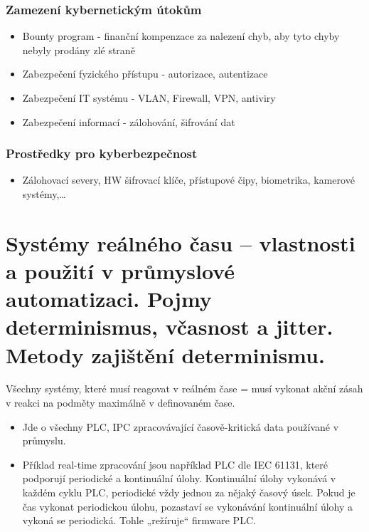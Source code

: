 \subsubsection*{Zamezení kybernetickým útokům}
\begin{itemize}
    \item Bounty program - finanční kompenzace za nalezení chyb, aby tyto chyby nebyly prodány zlé straně
    \item Zabezpečení fyzického přístupu - autorizace, autentizace
    \item Zabezpečení IT systému - VLAN, Firewall, VPN, antiviry
    \item Zabezpečení informací - zálohování, šifrování dat
\end{itemize}

\subsubsection*{Prostředky pro kyberbezpečnost}
\begin{itemize}
    \item Zálohovací severy, HW šifrovací klíče, přístupové čipy, biometrika, kamerové systémy,\dots
\end{itemize}

\section{Systémy reálného času – vlastnosti a použití v průmyslové automatizaci. Pojmy determinismus, včasnost a jitter. Metody zajištění determinismu.}
Všechny systémy, které musí reagovat v reálném čase = musí vykonat akční zásah v reakci na podměty maximálně v definovaném čase.
\begin{itemize}
    \item Jde o všechny PLC, IPC zpracovávající časově-kritická data používané v průmyslu.
    \item Příklad real-time zpracování jsou například PLC dle IEC 61131, které podporují periodické a kontinuální úlohy. Kontinuální úlohy vykonává v každém cyklu PLC, periodické vždy jednou za nějaký časový úsek. Pokud je čas vykonat periodickou úlohu, pozastaví se vykonávání kontinuální úlohy a vykoná se periodická. Tohle „režíruje“ firmware PLC.
\end{itemize}

